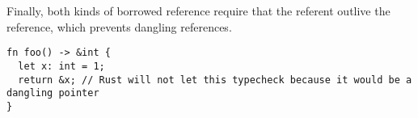 Finally, both kinds of borrowed reference require that the referent outlive the reference,
which prevents dangling references.
\begin{verbatim}
fn foo() -> &int {
  let x: int = 1;
  return &x; // Rust will not let this typecheck because it would be a dangling pointer
}
\end{verbatim}


%

